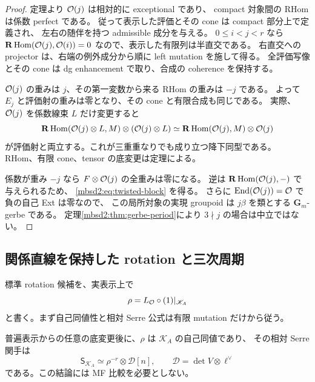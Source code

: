 \begin{proof}
定理より $\mathcal O(j)$ は相対的に exceptional であり、
compact 対象間の RHom は係数 perfect である。
従って表示した評価とその cone は compact 部分上で定義され、
左右の随伴を持つ admissible 成分を与える。
$0\leq i<j<r$ なら
$\mathbf R\operatorname{Hom}(\mathcal O(j),\mathcal O(i))=0$ なので、表示した有限列は半直交である。
右直交への projector は、右端の例外成分から順に left mutation を施して得る。
全評価写像とその cone は dg enhancement で取り、合成の coherence を保持する。

$\mathcal O(j)$ の重みは $j$、その第一変数から来る RHom の重みは $-j$ である。
よって $E_j$ と評価射の重みは零となり、その cone と有限合成も同じである。
実際、$\mathcal O(j)$ を係数線束 $L$ だけ変更すると
\[
 \mathbf R\operatorname{Hom}(\mathcal O(j)\otimes L,M)\otimes(\mathcal O(j)\otimes L)
 \simeq\mathbf R\operatorname{Hom}(\mathcal O(j),M)\otimes\mathcal O(j)
\]
が評価射と両立する。これが三重重なりでも成り立つ降下同型である。
RHom、有限 cone、tensor の底変更は定理による。

係数が重み $-j$ なら $F\otimes\mathcal O(j)$ の全重みは零になる。
逆は $\mathbf R\operatorname{Hom}(\mathcal O(j),-)$ で与えられるため、
\eqref{mbsd2:eq:twisted-block} を得る。
さらに $\operatorname{End}(\mathcal O(j))=\mathcal O$ で負の自己 Ext は零なので、
この局所対象の実現 groupoid は $j\beta$ を類とする $\mathbf G_m$-gerbe である。
定理\ref{mbsd2:thm:gerbe-period}により $3\nmid j$ の場合は中立ではない。
\end{proof}

\subsection{関係直線を保持した rotation と三次周期}

標準 rotation 候補を、実表示上で
\[
 \rho=L_{\mathcal O}\circ(1)|_{\mathscr K_A}
\]
と書く。まず自己同値性と相対 Serre 公式は有限 mutation だけから従う。

\begin{proposition}
\label{mbsd2:prop:rotation-serre}
普遍表示からの任意の底変更後に、$\rho$ は $\mathscr K_A$ の自己同値であり、
その相対 Serre 関手は
\begin{equation}\label{mbsd2:eq:rotation-serre}
 \mathsf S_{\mathscr K_A}
    \simeq\rho^{-r}\otimes\mathscr D[n],
 \qquad\mathscr D=\det V\otimes\ell^\vee
\end{equation}
である。この結論には MF 比較を必要としない。
\end{proposition}

